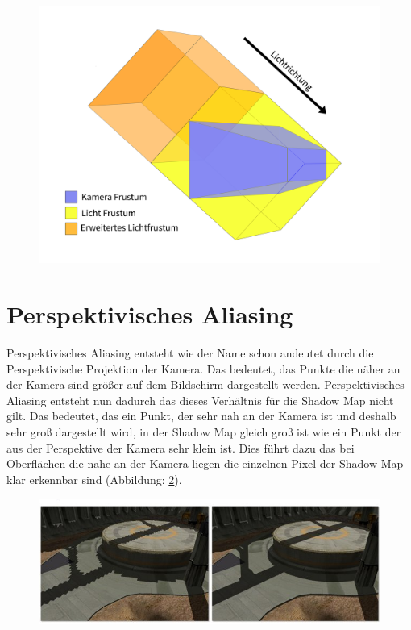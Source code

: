 \begin{figure}
	\begin{center}
		\includegraphics[width=1\textwidth]{res/img/fit-the-frustum.jpg}
    \caption{}
	\end{center}
	\label{fig:fit-the-frustum}
\end{figure}
\section{Perspektivisches Aliasing}
\label{section:perspective-aliasing}
Perspektivisches Aliasing entsteht wie der Name schon andeutet durch die Perspektivische Projektion
der Kamera. Das bedeutet, das Punkte die näher an der Kamera sind größer auf dem Bildschirm dargestellt werden.
Perspektivisches Aliasing entsteht nun dadurch das dieses Verhältnis für die Shadow Map nicht gilt.
Das bedeutet, das ein Punkt, der sehr nah an der Kamera ist und deshalb sehr groß dargestellt wird,
in der Shadow Map gleich groß ist wie ein Punkt der aus der Perspektive der Kamera sehr klein ist.
Dies führt dazu das bei Oberflächen die nahe an der Kamera liegen die einzelnen Pixel der Shadow Map klar erkennbar sind (Abbildung: \ref{fig:perspective-aliasing}).
\begin{figure}
	\begin{center}
		\includegraphics[width=1\textwidth]{res/img/perspective-aliasing1/image.jpg}
    \caption{}
	\end{center}
	\label{fig:perspective-aliasing}
\end{figure}
